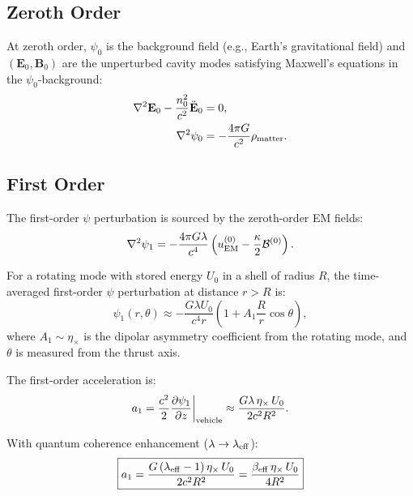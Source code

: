 \documentclass[twocolumn,prl,superscriptaddress,nofootinbib,longbibliography,floatfix]{revtex4-2}
\newcommand{\lam}{\lambda}
\newcommand{\kap}{\kappa}
\newcommand{\calB}{\mathcal{B}}
\begin{document}
\subsection{Zeroth Order}

At zeroth order, $\psi_0$ is the background field (e.g., Earth's
gravitational field) and $(\mathbf{E}_0, \mathbf{B}_0)$ are the
unperturbed cavity modes satisfying Maxwell's equations in the
$\psi_0$-background:
\begin{align}
\nabla^2\mathbf{E}_0 - \frac{n_0^2}{c^2}\ddot{\mathbf{E}}_0 &= 0,
\label{eq:zeroth-maxwell}\\
\nabla^2\psi_0 &= -\frac{4\pi G}{c^2}\rho_{\rm matter}.
\label{eq:zeroth-psi}
\end{align}

\subsection{First Order}

The first-order $\psi$ perturbation is sourced by the zeroth-order EM
fields:
\begin{equation}
\nabla^2\psi_1 = -\frac{4\pi G\lam}{c^4}
\left(u_{\rm EM}^{(0)} - \frac{\kap}{2}\calB^{(0)}\right).
\label{eq:first-psi}
\end{equation}

For a rotating mode with stored energy $U_0$ in a shell of radius $R$,
the time-averaged first-order $\psi$ perturbation at distance $r > R$ is:
\begin{equation}
\psi_1(r,\theta) \approx -\frac{G\lam U_0}{c^4 r}
\left(1 + A_1 \frac{R}{r}\cos\theta\right),
\label{eq:psi1-solution}
\end{equation}
where $A_1 \sim \eta_\times$ is the dipolar asymmetry coefficient from
the rotating mode, and $\theta$ is measured from the thrust axis.

The first-order acceleration is:
\begin{equation}
a_1 = \frac{c^2}{2}\frac{\partial\psi_1}{\partial z}\bigg|_{\rm vehicle}
\approx \frac{G\lam\,\eta_\times\,U_0}{2c^2 R^2}.
\label{eq:a1}
\end{equation}

With quantum coherence enhancement ($\lam \to \lam_{\rm eff}$):
\begin{equation}
\boxed{
a_1 = \frac{G\,(\lam_{\rm eff} - 1)\,\eta_\times\,U_0}{2c^2 R^2}
= \frac{\beta_{\rm eff}\,\eta_\times\,U_0}{4R^2}
}
\label{eq:a1-enhanced}
\end{equation}
\end{document}
